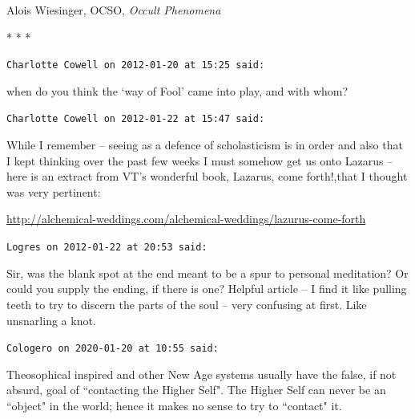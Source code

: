 Alois Wiesinger, OCSO, \textit{Occult Phenomena}




\begin{center}* * *\end{center}

\begin{footnotesize}\begin{sffamily}



\texttt{Charlotte Cowell on 2012-01-20 at 15:25 said: }

when do you think the `way of Fool' came into play, and with whom?


\hfill

\texttt{Charlotte Cowell on 2012-01-22 at 15:47 said: }

While I remember – seeing as a defence of scholasticism is in order and also that I kept thinking over the past few weeks I must somehow get us onto Lazarus – here is an extract from VT's wonderful book, Lazarus, come forth!,that I thought was very pertinent:

\url{http://alchemical-weddings.com/alchemical-weddings/lazurus-come-forth}


\hfill

\texttt{Logres on 2012-01-22 at 20:53 said: }

Sir, was the blank spot at the end meant to be a spur to personal meditation? Or could you supply the ending, if there is one? Helpful article – I find it like pulling teeth to try to discern the parts of the soul – very confusing at first. Like unsnarling a knot.


\hfill

\texttt{Cologero on 2020-01-20 at 10:55 said: }

Theosophical inspired and other New Age systems usually have the false, if not absurd, goal of ``contacting the Higher Self". The Higher Self can never be an ``object" in the world; hence it makes no sense to try to ``contact" it.


\end{sffamily}\end{footnotesize}
